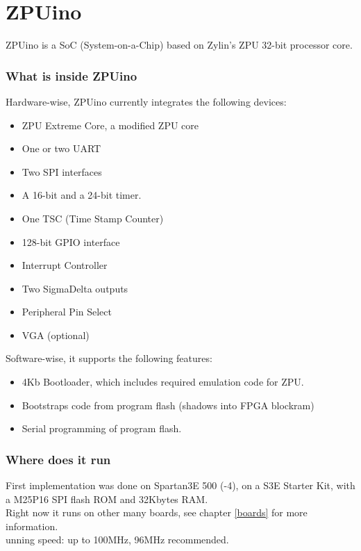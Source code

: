 \chapter{ZPUino}
ZPUino is a SoC (System-on-a-Chip) based on Zylin's ZPU 32-bit processor core.

\subsection{What is inside ZPUino}

Hardware-wise, ZPUino currently integrates the following devices:

\begin{itemize}
\item ZPU Extreme Core, a modified ZPU core
\item One or two UART
\item Two SPI interfaces
\item A 16-bit and a 24-bit timer.
\item One TSC (Time Stamp Counter)
\item 128-bit GPIO interface
\item Interrupt Controller
\item Two SigmaDelta outputs
\item Peripheral Pin Select
\item VGA (optional)
\end{itemize}

Software-wise, it supports the following features:

\begin{itemize}
\item 4Kb Bootloader, which includes required emulation code for ZPU.
\item Bootstraps code from program flash (shadows into FPGA blockram)
\item Serial programming of program flash.
\end{itemize}

\subsection{Where does it run}
First implementation was done on Spartan3E 500 (-4), on a S3E Starter Kit, with a M25P16 SPI flash ROM and 32Kbytes RAM.\\
Right now it runs on other many boards, see chapter \ref{boards} for more information. \\
unning speed: up to 100MHz, 96MHz recommended.

